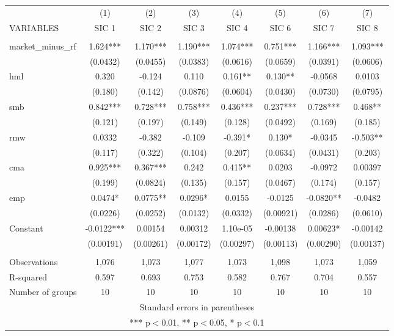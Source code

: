 \begin{tabular}{lccccccc} \hline
 & (1) & (2) & (3) & (4) & (5) & (6) & (7) \\
VARIABLES & SIC 1 & SIC 2 & SIC 3 & SIC 4 & SIC 6 & SIC 7 & SIC 8 \\ \hline
 &  &  &  &  &  &  &  \\
market\_minus\_rf & 1.624*** & 1.170*** & 1.190*** & 1.074*** & 0.751*** & 1.166*** & 1.093*** \\
 & (0.0432) & (0.0455) & (0.0383) & (0.0616) & (0.0659) & (0.0391) & (0.0606) \\
hml & 0.320 & -0.124 & 0.110 & 0.161** & 0.130** & -0.0568 & 0.0103 \\
 & (0.180) & (0.142) & (0.0876) & (0.0604) & (0.0430) & (0.0730) & (0.0795) \\
smb & 0.842*** & 0.728*** & 0.758*** & 0.436*** & 0.237*** & 0.728*** & 0.468** \\
 & (0.121) & (0.197) & (0.149) & (0.128) & (0.0492) & (0.169) & (0.185) \\
rmw & 0.0332 & -0.382 & -0.109 & -0.391* & 0.130* & -0.0345 & -0.503** \\
 & (0.117) & (0.322) & (0.104) & (0.207) & (0.0634) & (0.0431) & (0.203) \\
cma & 0.925*** & 0.367*** & 0.242 & 0.415** & 0.0203 & -0.0972 & 0.00397 \\
 & (0.199) & (0.0824) & (0.135) & (0.157) & (0.0467) & (0.174) & (0.157) \\
emp & 0.0474* & 0.0775** & 0.0296* & 0.0155 & -0.0125 & -0.0820** & -0.0482 \\
 & (0.0226) & (0.0252) & (0.0132) & (0.0332) & (0.00921) & (0.0286) & (0.0610) \\
Constant & -0.0122*** & 0.00154 & 0.00312 & 1.10e-05 & -0.00138 & 0.00623* & -0.00142 \\
 & (0.00191) & (0.00261) & (0.00172) & (0.00297) & (0.00113) & (0.00290) & (0.00137) \\
 &  &  &  &  &  &  &  \\
Observations & 1,076 & 1,073 & 1,077 & 1,073 & 1,098 & 1,073 & 1,059 \\
R-squared & 0.597 & 0.693 & 0.753 & 0.582 & 0.767 & 0.704 & 0.557 \\
 Number of groups & 10 & 10 & 10 & 10 & 10 & 10 & 10 \\ \hline
\multicolumn{8}{c}{ Standard errors in parentheses} \\
\multicolumn{8}{c}{ *** p$<$0.01, ** p$<$0.05, * p$<$0.1} \\
\end{tabular}
